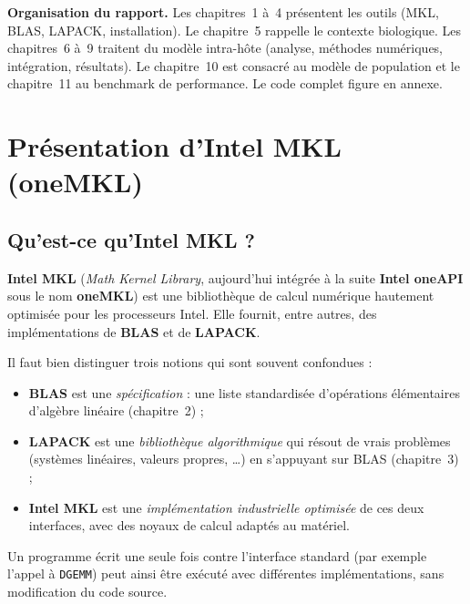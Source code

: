 \documentclass[11pt,a4paper]{report}
\theoremstyle{plain}
\theoremstyle{definition}
\theoremstyle{remark}
\begin{document}
\vspace{0.3cm}
\noindent\textbf{Organisation du rapport.}
Les chapitres~1 à~4 présentent les outils (MKL, BLAS, LAPACK, installation). Le chapitre~5 rappelle le contexte biologique. Les chapitres~6 à~9 traitent du modèle intra-hôte (analyse, méthodes numériques, intégration, résultats). Le chapitre~10 est consacré au modèle de population et le chapitre~11 au benchmark de performance. Le code complet figure en annexe.

\chapter{Présentation d'Intel MKL (oneMKL)}

\section{Qu'est-ce qu'Intel MKL ?}

\begin{cadreconcept}[Définition]
\textbf{Intel MKL} (\textit{Math Kernel Library}, aujourd'hui intégrée à la suite \textbf{Intel oneAPI} sous le nom \textbf{oneMKL}) est une bibliothèque de calcul numérique hautement optimisée pour les processeurs Intel. Elle fournit, entre autres, des implémentations de \textbf{BLAS} et de \textbf{LAPACK}.
\end{cadreconcept}

Il faut bien distinguer trois notions qui sont souvent confondues :
\begin{itemize}
    \item \textbf{BLAS} est une \emph{spécification} : une liste standardisée d'opérations élémentaires d'algèbre linéaire (chapitre~2) ;
    \item \textbf{LAPACK} est une \emph{bibliothèque algorithmique} qui résout de vrais problèmes (systèmes linéaires, valeurs propres, \dots) en s'appuyant sur BLAS (chapitre~3) ;
    \item \textbf{Intel MKL} est une \emph{implémentation industrielle optimisée} de ces deux interfaces, avec des noyaux de calcul adaptés au matériel.
\end{itemize}
Un programme écrit une seule fois contre l'interface standard (par exemple l'appel à \texttt{DGEMM}) peut ainsi être exécuté avec différentes implémentations, sans modification du code source.
\end{document}
